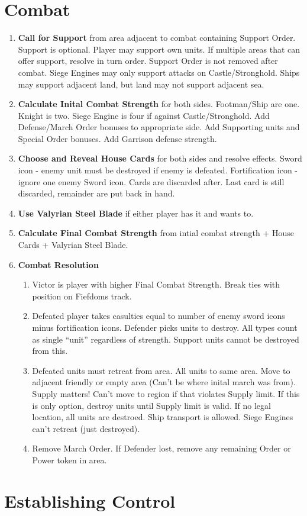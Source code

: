 \documentclass[12pt]{article}
\newenvironment{enumerateCustom}
{\begin{enumerate}
  \setlength{\itemsep}{1pt}
  \setlength{\parskip}{0pt}
  \setlength{\parsep}{0pt}}
{\end{enumerate}}
\begin{document}
\begin{multicols*}{2}
\section*{Combat}
\begin{enumerateCustom}
	\item \textbf{Call for Support} from area adjacent to combat containing Support Order. Support is optional. Player may support own units. If multiple areas that can offer support, resolve in turn order. Support Order is not removed after combat. Siege Engines may only support attacks on Castle/Stronghold. Ships may support adjacent land, but land may not support adjacent sea.
	\item \textbf{Calculate Inital Combat Strength} for both sides. Footman/Ship are one. Knight is two. Siege Engine is four if against Castle/Stronghold. Add Defense/March Order bonuses to appropriate side. Add Supporting units and Special Order bonuses. Add Garrison defense strength.
	\item \textbf{Choose and Reveal House Cards} for both sides and resolve effects. Sword icon - enemy unit must be destroyed if enemy is defeated. Fortification icon - ignore one enemy Sword icon. Cards are discarded after. Last card is still discarded, remainder are put back in hand.
	\item \textbf{Use Valyrian Steel Blade} if either player has it and wants to.
	\item \textbf{Calculate Final Combat Strength} from intial combat strength + House Cards + Valyrian Steel Blade.
	\item \textbf{Combat Resolution}
	\begin{enumerateCustom}
		\item Victor is player with higher Final Combat Strength. Break ties with position on Fiefdoms track.
		\item Defeated player takes casulties equal to number of enemy sword icons minus fortification icons. Defender picks units to destroy. All types count as single ``unit'' regardless of strength. Support units cannot be destroyed from this.
		\item Defeated units must retreat from area. All units to same area. Move to adjacent friendly or empty area (Can't be where inital march was from). Supply matters! Can't move to region if that violates Supply limit. If this is only option, destroy units until Supply limit is valid. If no legal location, all units are destroed. Ship transport is allowed. Siege Engines can't retreat (just destroyed).
		\item Remove March Order. If Defender lost, remove any remaining Order or Power token in area.
	\end{enumerateCustom}
\end{enumerateCustom}
\section*{Establishing Control}

\end{multicols*}
\end{document}
